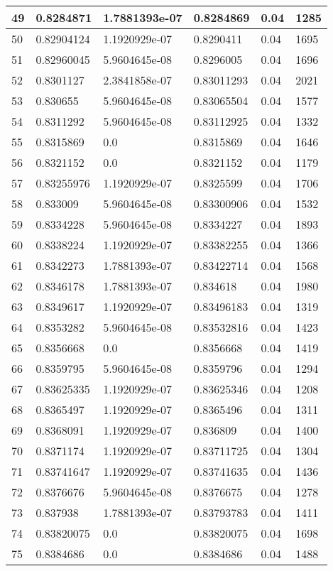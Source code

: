 \begin{longtable}{|l|l|l|l|l|l|}
49 & 0.8284871 & 1.7881393e-07 & 0.8284869 & 0.04 & 1285 \\ \hline 
50 & 0.82904124 & 1.1920929e-07 & 0.8290411 & 0.04 & 1695 \\ \hline 
51 & 0.82960045 & 5.9604645e-08 & 0.8296005 & 0.04 & 1696 \\ \hline 
52 & 0.8301127 & 2.3841858e-07 & 0.83011293 & 0.04 & 2021 \\ \hline 
53 & 0.830655 & 5.9604645e-08 & 0.83065504 & 0.04 & 1577 \\ \hline 
54 & 0.8311292 & 5.9604645e-08 & 0.83112925 & 0.04 & 1332 \\ \hline 
55 & 0.8315869 & 0.0 & 0.8315869 & 0.04 & 1646 \\ \hline 
56 & 0.8321152 & 0.0 & 0.8321152 & 0.04 & 1179 \\ \hline 
57 & 0.83255976 & 1.1920929e-07 & 0.8325599 & 0.04 & 1706 \\ \hline 
58 & 0.833009 & 5.9604645e-08 & 0.83300906 & 0.04 & 1532 \\ \hline 
59 & 0.8334228 & 5.9604645e-08 & 0.8334227 & 0.04 & 1893 \\ \hline 
60 & 0.8338224 & 1.1920929e-07 & 0.83382255 & 0.04 & 1366 \\ \hline 
61 & 0.8342273 & 1.7881393e-07 & 0.83422714 & 0.04 & 1568 \\ \hline 
62 & 0.8346178 & 1.7881393e-07 & 0.834618 & 0.04 & 1980 \\ \hline 
63 & 0.8349617 & 1.1920929e-07 & 0.83496183 & 0.04 & 1319 \\ \hline 
64 & 0.8353282 & 5.9604645e-08 & 0.83532816 & 0.04 & 1423 \\ \hline 
65 & 0.8356668 & 0.0 & 0.8356668 & 0.04 & 1419 \\ \hline 
66 & 0.8359795 & 5.9604645e-08 & 0.8359796 & 0.04 & 1294 \\ \hline 
67 & 0.83625335 & 1.1920929e-07 & 0.83625346 & 0.04 & 1208 \\ \hline 
68 & 0.8365497 & 1.1920929e-07 & 0.8365496 & 0.04 & 1311 \\ \hline 
69 & 0.8368091 & 1.1920929e-07 & 0.836809 & 0.04 & 1400 \\ \hline 
70 & 0.8371174 & 1.1920929e-07 & 0.83711725 & 0.04 & 1304 \\ \hline 
71 & 0.83741647 & 1.1920929e-07 & 0.83741635 & 0.04 & 1436 \\ \hline 
72 & 0.8376676 & 5.9604645e-08 & 0.8376675 & 0.04 & 1278 \\ \hline 
73 & 0.837938 & 1.7881393e-07 & 0.83793783 & 0.04 & 1411 \\ \hline 
74 & 0.83820075 & 0.0 & 0.83820075 & 0.04 & 1698 \\ \hline 
75 & 0.8384686 & 0.0 & 0.8384686 & 0.04 & 1488 \\ \hline 
\end{longtable}